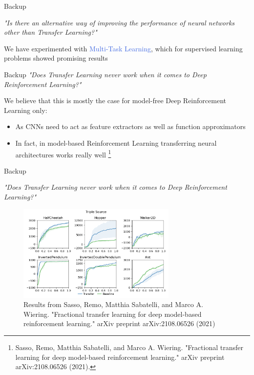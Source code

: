 \documentclass{beamer}
\begin{document}
\begin{frame}{Backup}

	\bigskip
	
	\textit{"Is there an alternative way of improving the performance of neural networks other than Transfer Learning?"}

	\bigskip
	
	We have experimented with \textcolor{RoyalBlue}{Multi-Task Learning}, which for supervised learning problems showed promising results 
	
	\bigskip
	
	
	 

\end{frame}

\begin{frame}{Backup}
	\textit{"Does Transfer Learning never work when it comes to Deep Reinforcement Learning?"}

	\bigskip
	
	We believe that this is mostly the case for model-free Deep Reinforcement Learning only:
	\begin{itemize}
		\item As CNNs need to act as feature extractors as well as function approximators
		\item In fact, in model-based Reinforcement Learning transferring neural architectures works really well \footnote{Sasso, Remo, Matthia Sabatelli, and Marco A. Wiering. "Fractional transfer learning for deep model-based reinforcement learning." arXiv preprint arXiv:2108.06526 (2021).}
	\end{itemize}

\end{frame}


\begin{frame}{Backup}

	\bigskip
	
	\textit{"Does Transfer Learning never work when it comes to Deep Reinforcement Learning?"}

	\bigskip
		\begin{figure}
			\includegraphics[width=0.7\textwidth]{figures/triple}
			\caption{Results from Sasso, Remo, Matthia Sabatelli, and Marco A. Wiering. "Fractional transfer learning for deep model-based reinforcement learning." arXiv preprint arXiv:2108.06526 (2021)}
		\end{figure}
	

\end{frame}
\end{document}
